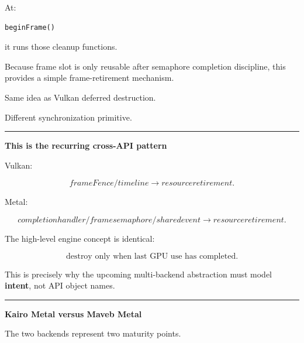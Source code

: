 At:

\begin{verbatim}
beginFrame()
\end{verbatim}

it runs those cleanup functions.

Because frame slot is only reusable after semaphore completion discipline, this provides a simple frame-retirement mechanism.

Same idea as Vulkan deferred destruction.

Different synchronization primitive.

\begin{center}\rule{0.5\linewidth}{0.5pt}\end{center}

\textbf{This is the recurring cross-API pattern}

Vulkan:

\[
frameFence/timeline
\rightarrow
resource retirement.
\]

Metal:

\[
completion handler/frame semaphore/shared event
\rightarrow
resource retirement.
\]

The high-level engine concept is identical:

\[
\boxed{
\text{destroy only when last GPU use has completed}.
}
\]

This is precisely why the upcoming multi-backend abstraction must model \textbf{intent}, not API object names.

\begin{center}\rule{0.5\linewidth}{0.5pt}\end{center}

\textbf{Kairo Metal versus Maveb Metal}

The two backends represent two maturity points.

